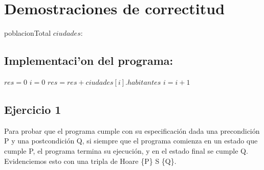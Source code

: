 \documentclass[10pt,a4paper]{article}
\begin{document}
\setcounter{section}{1}

\section{Demostraciones de correctitud}

	\begin{proc}{poblacionTotal} {\In $ciudades$:}{\ent}
		\end{proc}
		

\vspace{0.3cm}
\subsection*{Implementaci'on del programa:}


\begin{algorithmic}
	
	\STATE $res = 0$
	\STATE $i=0$
	\STATE	$res= res + ciudades[i].habitantes$
	\STATE $i = i + 1$
	\ENDWHILE
	
	
\end{algorithmic}

\subsection*{}
\subsection{Ejercicio 1}

  Para probar que el programa cumple con su especificación dada una precondición P y una postcondición Q, si
 siempre que el programa comienza en un estado que cumple P, el programa termina su ejecución, y en el estado 
 final se cumple Q. Evidenciemos esto con una tripla de Hoare \{P\} S \{Q\}.

\vspace{0.3 cm}
\end{document}
